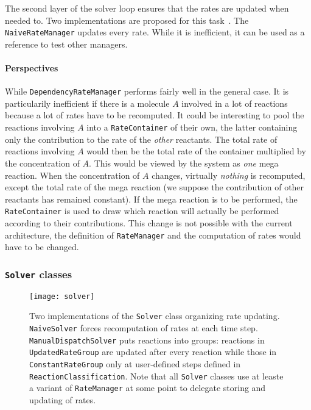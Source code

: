 The second layer of the solver loop ensures that the rates are updated when needed to. Two implementations are proposed for this task~. The \texttt{NaiveRateManager} updates every rate. While it is inefficient, it can be used as a reference to test other managers.

\paragraph{Perspectives} While \texttt{DependencyRateManager} performs fairly well in the general case. It is particularily inefficient if there is a molecule $A$ involved in a lot of reactions because a lot of rates have to be recomputed. It could be interesting to pool the reactions involving $A$ into a \texttt{RateContainer} of their own, the latter containing only the contribution to the rate of the \emph{other} reactants. The total rate of reactions involving $A$ would then be the total rate of the container multiplied by the concentration of $A$. This would be viewed by the system as \emph{one} mega reaction. When the concentration of $A$ changes, virtually \emph{nothing} is recomputed, except the total rate of the mega reaction (we suppose the contribution of other reactants has remained constant). If the mega reaction is to be performed, the \texttt{RateContainer} is used to draw which reaction will actually be performed according to their contributions. This change is not possible with the current architecture, the definition of \texttt{RateManager} and the computation of rates would have to be changed.

\subsubsection{\texttt{Solver} classes}

\begin{figure}[!h]
  \centering
  \texttt{[image: solver]}
  \caption{Two implementations of the \texttt{Solver} class organizing rate updating. \texttt{NaiveSolver} forces recomputation of rates at each time step. \texttt{ManualDispatchSolver} puts reactions into groups: reactions in \texttt{UpdatedRateGroup} are updated after every reaction while those in \texttt{ConstantRateGroup} only at user-defined steps defined in \texttt{ReactionClassification}. Note that all \texttt{Solver} classes use at leaste a variant of \texttt{RateManager} at some point to delegate storing and updating of rates.}
  \label{fig:solver_details}
\end{figure}

